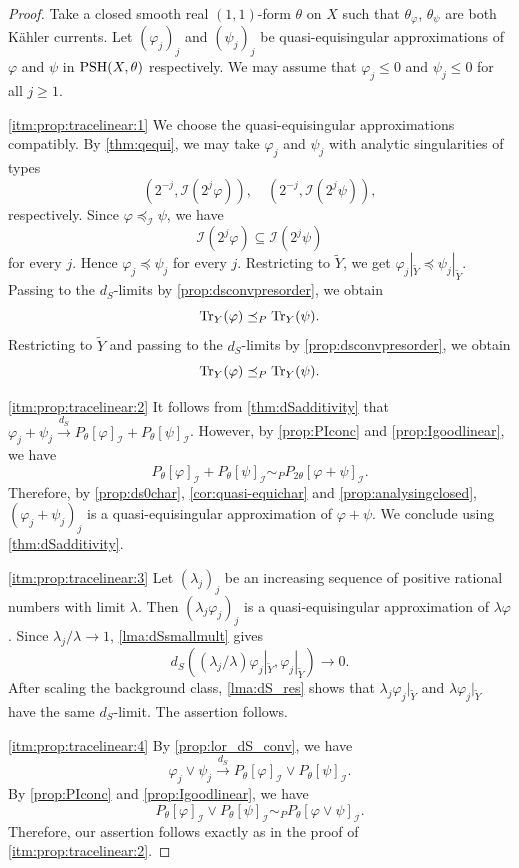 \begin{proof}
    Take a closed smooth real $(1,1)$-form $\theta$ on $X$ such that $\theta_{\varphi}$, $\theta_{\psi}$ are both Kähler currents.
    Let $(\varphi_j)_j$ and $(\psi_j)_j$ be quasi-equisingular approximations of $\varphi$ and $\psi$ in $\mathrm{PSH}(X,\theta)$ respectively. We may assume that $\varphi_j\leq 0$ and $\psi_j\leq 0$ for all $j\geq 1$.

    \ref{itm:prop:tracelinear:1} We choose the quasi-equisingular approximations compatibly. By \cref{thm:qequi}, we may take $\varphi_j$ and $\psi_j$ with analytic singularities of types
    \[
    \left(2^{-j},\mathcal I(2^j\varphi)\right), \quad \left(2^{-j},\mathcal I(2^j\psi)\right),
    \]
    respectively. Since $\varphi\preceq_{\mathcal I}\psi$, we have
    \[
        \mathcal I(2^j\varphi)\subseteq \mathcal I(2^j\psi)
    \]
    for every $j$. Hence $\varphi_j\preceq\psi_j$ for every $j$. Restricting to $\widetilde{Y}$, we get $\varphi_j|_{\widetilde{Y}}\preceq\psi_j|_{\widetilde{Y}}$. Passing to the $d_S$-limits by \cref{prop:dsconvpresorder}, we obtain
    \[
        \operatorname{Tr}_Y(\varphi)\preceq_P\operatorname{Tr}_Y(\psi).
    \]
    Restricting to $\widetilde{Y}$ and passing to the $d_S$-limits by \cref{prop:dsconvpresorder}, we obtain
    \[
        \operatorname{Tr}_Y(\varphi)\preceq_P \operatorname{Tr}_Y(\psi).
    \]

    \ref{itm:prop:tracelinear:2} It follows from \cref{thm:dSadditivity} that $\varphi_j+\psi_j\xrightarrow{d_S}P_{\theta}[\varphi]_{\mathcal{I}}+P_{\theta}[\psi]_{\mathcal{I}}$. However, by \cref{prop:PIconc} and \cref{prop:Igoodlinear}, we have
    \[
        P_{\theta}[\varphi]_{\mathcal{I}}+P_{\theta}[\psi]_{\mathcal{I}}\sim_P P_{2\theta}[\varphi+\psi]_{\mathcal{I}}.
    \]
    Therefore, by \cref{prop:ds0char}, \cref{cor:quasi-equichar} and \cref{prop:analysingclosed}, $(\varphi_j+\psi_j)_j$ is a quasi-equisingular approximation of $\varphi+\psi$. We conclude using \cref{thm:dSadditivity}.

    \ref{itm:prop:tracelinear:3} Let $(\lambda_j)_j$ be an increasing sequence of positive rational numbers with limit $\lambda$. Then $(\lambda_j\varphi_j)_j$ is a quasi-equisingular approximation of $\lambda\varphi$.
    Since $\lambda_j/\lambda\to 1$, \cref{lma:dSsmallmult} gives
    \[
        d_S\left((\lambda_j/\lambda)\varphi_j|_{\widetilde{Y}},\varphi_j|_{\widetilde{Y}}\right)\to 0.
    \]
    After scaling the background class, \cref{lma:dS_res} shows that $\lambda_j\varphi_j|_{\widetilde{Y}}$ and $\lambda\varphi_j|_{\widetilde{Y}}$ have the same $d_S$-limit. The assertion follows.

    \ref{itm:prop:tracelinear:4} By \cref{prop:lor_dS_conv}, we have
    \[
        \varphi_j\lor \psi_j\xrightarrow{d_S} P_{\theta}[\varphi]_{\mathcal{I}}\lor P_{\theta}[\psi]_{\mathcal{I}}.
    \]
    By \cref{prop:PIconc} and \cref{prop:Igoodlinear}, we have
    \[
        P_{\theta}[\varphi]_{\mathcal{I}}\lor P_{\theta}[\psi]_{\mathcal{I}}\sim_P P_{\theta}[\varphi\lor \psi]_{\mathcal{I}}.
    \]
    Therefore, our assertion follows exactly as in the proof of \ref{itm:prop:tracelinear:2}.
\end{proof}

